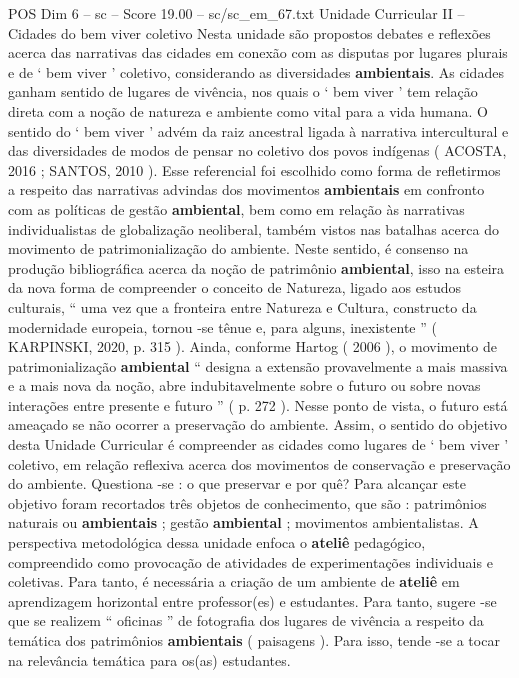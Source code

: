 \begin{textsample}{POS Dim 6 – sc – Score 19.00 – sc/sc\_em\_67.txt}
Unidade Curricular II – Cidades do bem viver coletivo Nesta unidade são propostos debates e reflexões acerca das narrativas das cidades em conexão com as disputas por lugares plurais e de ‘ bem viver ’ coletivo, considerando as diversidades \textbf{ambientais}.
As cidades ganham sentido de lugares de vivência, nos quais o ‘ bem viver ’ tem relação direta com a noção de natureza e ambiente como vital para a vida humana.
O sentido do ‘ bem viver ’ advém da raiz ancestral ligada à narrativa intercultural e das diversidades de modos de pensar no coletivo dos povos indígenas ( ACOSTA, 2016 ; SANTOS, 2010 ).
Esse referencial foi escolhido como forma de refletirmos a respeito das narrativas advindas dos movimentos \textbf{ambientais} em confronto com as políticas de gestão \textbf{ambiental}, bem como em relação às narrativas individualistas de globalização neoliberal, também vistos nas batalhas acerca do movimento de patrimonialização do ambiente.
Neste sentido, é consenso na produção bibliográfica acerca da noção de patrimônio \textbf{ambiental}, isso na esteira da nova forma de compreender o conceito de Natureza, ligado aos estudos culturais, “ uma vez que a fronteira entre Natureza e Cultura, constructo da modernidade europeia, tornou -se tênue e, para alguns, inexistente ” ( KARPINSKI, 2020, p. 315 ).
Ainda, conforme Hartog ( 2006 ), o movimento de patrimonialização \textbf{ambiental} “ designa a extensão provavelmente a mais massiva e a mais nova da noção, abre indubitavelmente sobre o futuro ou sobre novas interações entre presente e futuro ” ( p. 272 ).
Nesse ponto de vista, o futuro está ameaçado se não ocorrer a preservação do ambiente.
Assim, o sentido do objetivo desta Unidade Curricular é compreender as cidades como lugares de ‘ bem viver ’ coletivo, em relação reflexiva acerca dos movimentos de conservação e preservação do ambiente.
Questiona -se : o que preservar e por quê?
Para alcançar este objetivo foram recortados três objetos de conhecimento, que são : patrimônios naturais ou \textbf{ambientais} ; gestão \textbf{ambiental} ; movimentos ambientalistas.
A perspectiva metodológica dessa unidade enfoca o \textbf{ateliê} pedagógico, compreendido como provocação de atividades de experimentações individuais e coletivas.
Para tanto, é necessária a criação de um ambiente de \textbf{ateliê} em aprendizagem horizontal entre professor(es) e estudantes.
Para tanto, sugere -se que se realizem “ oficinas ” de fotografia dos lugares de vivência a respeito da temática dos patrimônios \textbf{ambientais} ( paisagens ).
Para isso, tende -se a tocar na relevância temática para os(as) estudantes.

\end{textsample}
